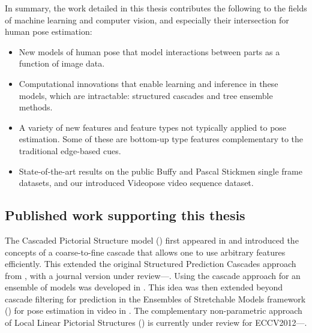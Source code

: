 In summary, the work detailed in this thesis contributes the following to the 
fields of machine learning and computer vision, and especially their 
intersection for human pose estimation:
\begin{itemize}

\item New models of human pose that model interactions between parts as a 
function of image data.

\item Computational innovations that enable learning and inference in these 
models, which are \naively intractable: structured cascades and tree ensemble 
methods.

\item A variety of new features and feature types not typically applied to pose 
estimation.  Some of these are bottom-up type features complementary to the 
traditional edge-based cues.

\item State-of-the-art results on the public Buffy and Pascal Stickmen single 
frame datasets, and our introduced Videopose video sequence dataset.

\end{itemize}


\subsection{Published work supporting this thesis}


The Cascaded Pictorial Structure model () first appeared in 
\citet{sapp2010cascades} and introduced the concepts of a coarse-to-fine 
cascade that allows one to use arbitrary features efficiently.  This extended 
the original Structured Prediction Cascades approach from \citet{cascades}, 
with a journal version under review---\citet{cascades-jmlr}.
Using the cascade approach for an ensemble of models was developed in 
\citet{weisssapp10}.  This idea was then extended beyond cascade filtering for 
prediction in the Ensembles of Stretchable Models framework 
() for pose estimation in video in \citet{sapp2011}.  The 
complementary non-parametric approach of Local Linear Pictorial Structures 
() is currently under review for ECCV2012---\citet{sapp-llps}.
